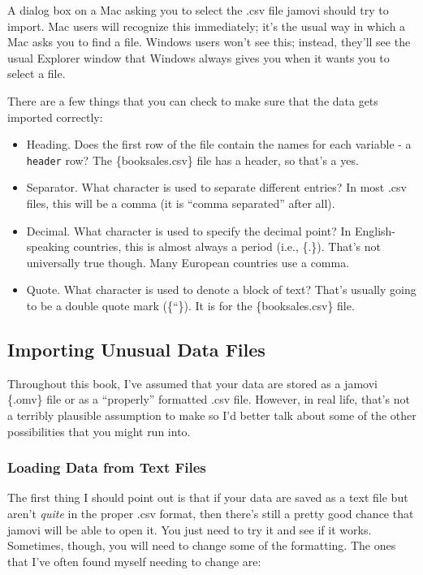\documentclass[
]{book}
\begin{document}
\caption{A dialog box on a Mac asking you to select the .csv file jamovi should try to import. Mac users will recognize this immediately; it's the usual way in which a Mac asks you to find a file. Windows users won't see this; instead, they'll see the usual Explorer window that Windows always gives you when it wants you to select a file.}

There are a few things that you can check to make sure that the data gets imported correctly:

\begin{itemize}
\item
  Heading. Does the first row of the file contain the names for each variable - a \texttt{header} row? The \{booksales.csv\} file has a header, so that's a yes.
\item
  Separator. What character is used to separate different entries? In most .csv files, this will be a comma (it is ``comma separated'' after all).
\item
  Decimal. What character is used to specify the decimal point? In English-speaking countries, this is almost always a period (i.e., \{.\}). That's not universally true though. Many European countries use a comma.
\item
  Quote. What character is used to denote a block of text? That's usually going to be a double quote mark (\{``\}). It is for the \{booksales.csv\} file.
\end{itemize}

\hypertarget{importing-unusual-data-files}{%
\subsection{Importing Unusual Data Files}\label{importing-unusual-data-files}}

Throughout this book, I've assumed that your data are stored as a jamovi \{.omv\} file or as a ``properly'' formatted .csv file. However, in real life, that's not a terribly plausible assumption to make so I'd better talk about some of the other possibilities that you might run into.

\hypertarget{loading-data-from-text-files}{%
\subsubsection{Loading Data from Text Files}\label{loading-data-from-text-files}}

The first thing I should point out is that if your data are saved as a text file but aren't \emph{quite} in the proper .csv format, then there's still a pretty good chance that jamovi will be able to open it. You just need to try it and see if it works. Sometimes, though, you will need to change some of the formatting. The ones that I've often found myself needing to change are:
\end{document}
